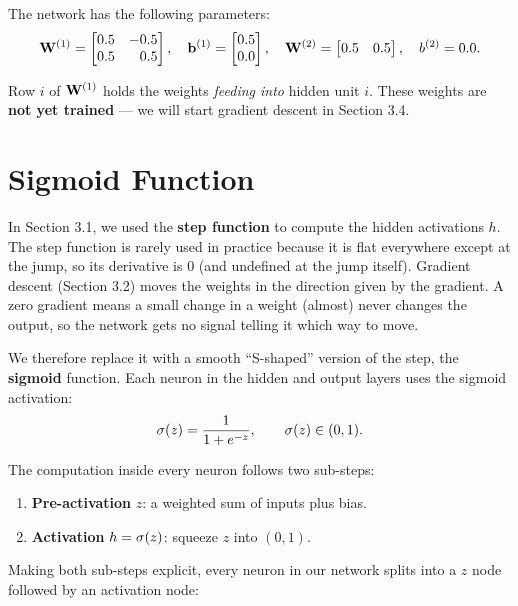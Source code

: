 \documentclass[12pt, a4paper]{article}
\begin{document}
\vspace{0.5em}

The network has the following parameters:
\[
  \mathbf{W}^{(1)} = \begin{bmatrix} 0.5 & -0.5 \\ 0.5 & \phantom{-}0.5 \end{bmatrix},
  \quad
  \mathbf{b}^{(1)} = \begin{bmatrix} 0.5 \\ 0.0 \end{bmatrix},
  \quad
  \mathbf{W}^{(2)} = \begin{bmatrix} 0.5 & 0.5 \end{bmatrix},
  \quad
  b^{(2)} = 0.0.
\]

Row $i$ of $\mathbf{W}^{(1)}$ holds the weights \emph{feeding into} hidden unit $i$.
These weights are \textbf{not yet trained} --- we will start gradient descent
in Section 3.4.

\section{Sigmoid Function}
In Section 3.1, we used the \textbf{step function} to compute the hidden
activations $h$. The step function is rarely used in practice because it is
flat everywhere except at the jump, so its derivative is $0$ (and undefined
at the jump itself).
Gradient descent (Section 3.2) moves the weights in the direction given by
the gradient. A zero gradient means a small change in a weight (almost) never changes
the output, so the network gets no signal telling it which way to move.

We therefore replace it with a smooth ``S-shaped'' version of the step,
the \textbf{sigmoid} function. Each neuron in the hidden and output layers uses
the sigmoid activation:
\[
  \sigma(z) = \frac{1}{1 + e^{-z}}, \qquad \sigma(z) \in (0, 1).
\]

The computation inside every neuron follows two sub-steps:
\begin{enumerate}[nosep]
  \item \textbf{Pre-activation} $z$: a weighted sum of inputs plus bias.
  \item \textbf{Activation} $h = \sigma(z)$: squeeze $z$ into $(0,1)$.
\end{enumerate}

Making both sub-steps explicit, every neuron in our network splits into a
$z$ node followed by an activation node:
\end{document}
